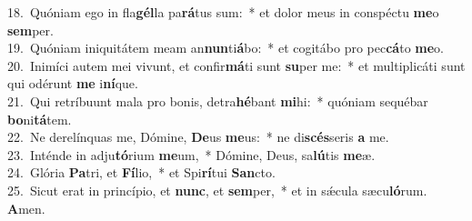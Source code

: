 {18.~}Quóniam ego in fla\textbf{gél}la pa\textbf{rá}tus sum:~* et dolor meus in conspéctu \textbf{me}o \textbf{sem}per.\\
{19.~}Quóniam iniquitátem meam an\textbf{nun}ti\textbf{á}bo:~* et cogitábo pro pec\textbf{cá}to \textbf{me}o.\\
{20.~}Inimíci autem mei vivunt, et confir\textbf{má}ti sunt \textbf{su}per me:~* et multiplicáti sunt qui odérunt \textbf{me} i\textbf{ní}que.\\
{21.~}Qui retríbuunt mala pro bonis, detra\textbf{hé}bant \textbf{mi}hi:~* quóniam sequébar \textbf{bo}ni\textbf{tá}tem.\\
{22.~}Ne derelínquas me, Dómine, \textbf{De}us \textbf{me}us:~* ne di\textbf{scés}seris \textbf{a} me.\\
{23.~}Inténde in adju\textbf{tó}rium \textbf{me}um,~* Dómine, Deus, sa\textbf{lú}tis \textbf{me}æ.\\
{24.~}Glória \textbf{Pa}tri, et \textbf{Fí}lio,~* et Spi\textbf{rí}tui \textbf{San}cto.\\
{25.~}Sicut erat in princípio, et \textbf{nunc}, et \textbf{sem}per,~* et in sǽcula sæcu\textbf{ló}rum. \textbf{A}men.\\
